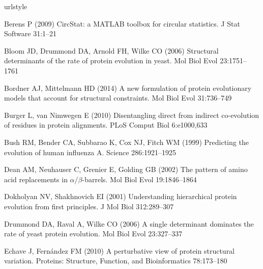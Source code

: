 \documentclass[smallextended]{svjour3}
\begin{document}
\begin{thebibliography}{59}
\providecommand{\natexlab}[1]{#1}
\providecommand{\url}[1]{{#1}}
\providecommand{\urlprefix}{URL }
\expandafter\ifx\csname urlstyle\endcsname\relax
  \providecommand{\doi}[1]{DOI~\discretionary{}{}{}#1}\else
  \providecommand{\doi}{DOI~\discretionary{}{}{}\begingroup
  \urlstyle{rm}\Url}\fi
\providecommand{\eprint}[2][]{\url{#2}}

Berens P (2009) {CircStat:} a {MATLAB} toolbox for circular statistics. J Stat
  Software 31:1--21

Bloom JD, Drummond DA, Arnold FH, Wilke CO (2006) Structural determinants of
  the rate of protein evolution in yeast. Mol Biol Evol 23:1751--1761

Bordner AJ, Mittelmann HD (2014) A new formulation of protein evolutionary
  models that account for structural constraints. Mol Biol Evol 31:736--749

Burger L, van Nimwegen E (2010) Disentangling direct from indirect co-evolution
  of residues in protein alignments. PLoS Comput Biol 6:e1000,633

Bush RM, Bender CA, Subbarao K, Cox NJ, Fitch WM (1999) Predicting the
  evolution of human influenza {A}. Science 286:1921--1925

Dean AM, Neuhauser C, Grenier E, Golding GB (2002) The pattern of amino acid
  replacements in $\alpha$/$\beta$-barrels. Mol Biol Evol 19:1846--1864

Dokholyan NV, Shakhnovich EI (2001) Understanding hierarchical protein
  evolution from first principles. J Mol Biol 312:289--307

Drummond DA, Raval A, Wilke CO (2006) A single determinant dominates the rate
  of yeast protein evolution. Mol Biol Evol 23:327--337

Echave J, Fern\'a{}ndez FM (2010) A perturbative view of protein structural
  variation. Proteins: Structure, Function, and Bioinformatics 78:173--180


\end{thebibliography}
\end{document}
